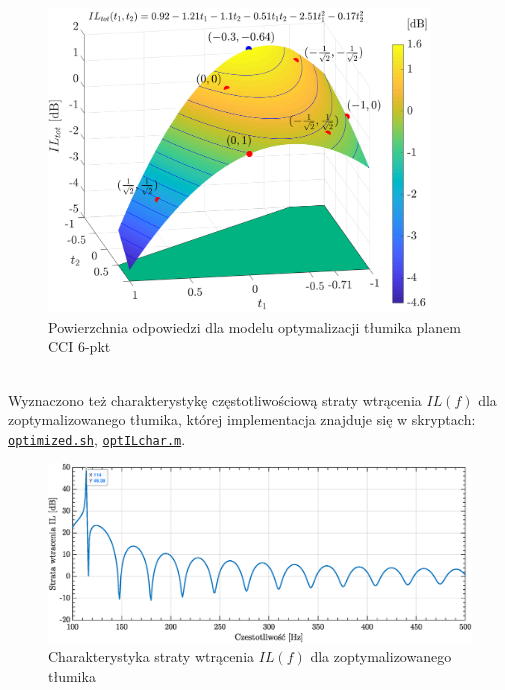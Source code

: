 \documentclass{sprawozdanie-agh}
\begin{document}
\begin{figure}[htbp!]
\centering
\includegraphics[width=0.9\textwidth]{surf_plot.png}
\caption{\vspace{-0.3cm}Powierzchnia odpowiedzi dla modelu optymalizacji tłumika planem CCI 6-pkt}
\label{plane}
\end{figure}
\\ \newline Wyznaczono też charakterystykę częstotliwościową straty wtrącenia $IL(f)$ dla zoptymalizowanego tłumika, której implementacja znajduje się w skryptach: \hyperref[list9]{\texttt{optimized.sh}}, \hyperref[list10]{\texttt{optILchar.m}}.
\vspace{-0.2cm}
\begin{figure}[htbp!]
    \centering
    \includegraphics[width=\textwidth]{charIL.eps}
    \caption{Charakterystyka straty wtrącenia $IL(f)$ dla zoptymalizowanego tłumika}
    \label{wykres2}
\end{figure}
\newpage
\end{document}
